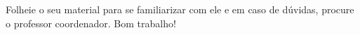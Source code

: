 \documentclass[openany]{book}
\begin{document}
Folheie o seu material para se familiarizar com ele e em caso de dúvidas, procure o professor coordenador. Bom trabalho!







 



 
\end{document}
